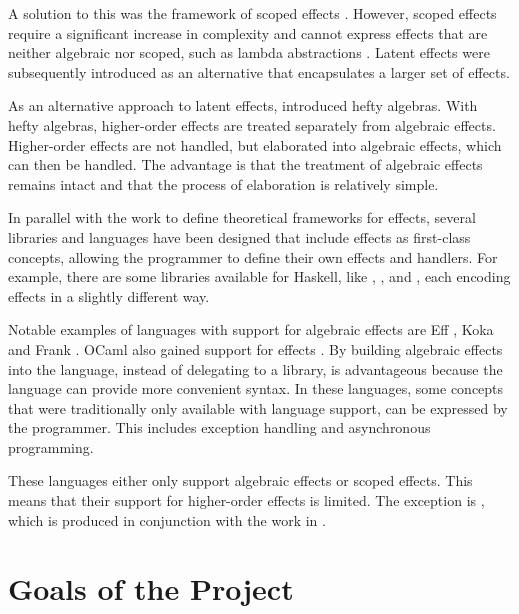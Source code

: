 \documentclass{article}
\begin{document}
A solution to this was the framework of scoped effects \cite{wu_effect_2014}. However, scoped effects require a significant increase in complexity and cannot express effects that are neither algebraic nor scoped, such as lambda abstractions \cite{oh_latent_2021}. Latent effects \cite{oh_latent_2021} were subsequently introduced as an alternative that encapsulates a larger set of effects.

As an alternative approach to latent effects, \textcite{bach_poulsen_hefty_2023} introduced hefty algebras. With hefty algebras, higher-order effects are treated separately from algebraic effects. Higher-order effects are not handled, but elaborated into algebraic effects, which can then be handled. The advantage is that the treatment of algebraic effects remains intact and that the process of elaboration is relatively simple.

In parallel with the work to define theoretical frameworks for effects, several libraries and languages have been designed that include effects as first-class concepts, allowing the programmer to define their own effects and handlers. For example, there are some libraries available for Haskell, like , ,  and , each encoding effects in a slightly different way.

Notable examples of languages with support for algebraic effects are Eff \cite{bauer_programming_2015}, Koka \cite{leijen_type_2017} and Frank \cite{lindley_be_2017}. OCaml also gained support for effects \cite{sivaramakrishnan_retrofitting_2021}. By building algebraic effects into the language, instead of delegating to a library, is advantageous because the language can provide more convenient syntax. In these languages, some concepts that were traditionally only available with language support, can be expressed by the programmer. This includes exception handling and asynchronous programming.

These languages either only support algebraic effects or scoped effects. This means that their support for higher-order effects is limited. The exception is , which is produced in conjunction with the work in \cite{bach_poulsen_hefty_2023}.

\section{Goals of the Project}
\end{document}
